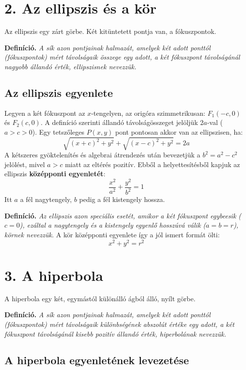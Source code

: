 \documentclass[12pt, a4paper]{article}
\newcommand{\textbfr}[1]{\textbf{\textcolor{bvred}{#1}}}
\begin{document}
\section*{2. Az ellipszis és a kör}

Az ellipszis egy zárt görbe. Két kitüntetett pontja van, a fókuszpontok.

\textbf{Definíció.} \textit{A sík azon pontjainak halmazát, amelyek két adott ponttól (fókuszpontok) mért távolságaik összege egy adott, a két fókuszpont távolságánál nagyobb állandó érték, \textcolor{bvred}{ellipszisnek} nevezzük.}

\subsection*{Az ellipszis egyenlete}

Legyen a két fókuszpont az $x$-tengelyen, az origóra szimmetrikusan: $F_1(-c, 0)$ és $F_2(c, 0)$. A definíció szerinti állandó távolságösszeget jelöljük $2a$-val ($a > c > 0$).
Egy tetszőleges $P(x,y)$ pont pontosan akkor van az ellipszisen, ha:
\[ \sqrt{(x+c)^2 + y^2} + \sqrt{(x-c)^2 + y^2} = 2a \]
A kétszeres gyöktelenítés és algebrai átrendezés után bevezetjük a $b^2 = a^2 - c^2$ jelölést, mivel $a > c$ miatt az eltérés pozitív. Ebből a helyettesítésből kapjuk az ellipszis \textbfr{középponti egyenletét}:
\[ \frac{x^2}{a^2} + \frac{y^2}{b^2} = 1 \]
Itt $a$ a fél nagytengely, $b$ pedig a fél kistengely hossza. 

\textbf{Definíció.} \textit{Az ellipszis azon speciális esetét, amikor a két fókuszpont egybeesik ($c=0$), ezáltal a nagytengely és a kistengely egyenlő hosszúvá válik ($a=b=r$), \textcolor{bvred}{körnek} nevezzük.}
A kör középponti egyenlete így a jól ismert formát ölti:
\[ x^2 + y^2 = r^2 \]

\section*{3. A hiperbola}

A hiperbola egy két, egymástól különálló ágból álló, nyílt görbe.

\textbf{Definíció.} \textit{A sík azon pontjainak halmazát, amelyek két adott ponttól (fókuszpontok) mért távolságaik különbségének abszolút értéke egy adott, a két fókuszpont távolságánál kisebb pozitív állandó érték, \textcolor{bvred}{hiperbolának} nevezzük.}

\subsection*{A hiperbola egyenletének levezetése}
\end{document}
